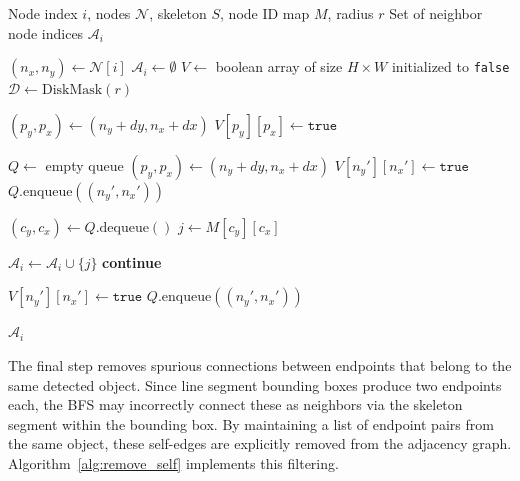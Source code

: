 \begin{algorithm}[H]
\caption{BFS Neighbors for Node}
\label{alg:bfs_node}
\begin{algorithmic}[1]
\Require Node index $i$, nodes $\mathcal{N}$, skeleton $S$, node ID map $M$, radius $r$
\Ensure Set of neighbor node indices $\mathcal{A}_i$

\State $(n_x, n_y) \gets \mathcal{N}[i]$
\State $\mathcal{A}_i \gets \emptyset$
\State $V \gets$ boolean array of size $H \times W$ initialized to \texttt{false}
\State $\mathcal{D} \gets \text{DiskMask}(r)$

    \State $(p_y, p_x) \gets (n_y + dy, n_x + dx)$
        \State $V[p_y][p_x] \gets \texttt{true}$
    \EndIf
\EndFor

\State $Q \gets$ empty queue
    \State $(p_y, p_x) \gets (n_y + dy, n_x + dx)$
            \State $V[n_y'][n_x'] \gets \texttt{true}$
            \State $Q.\text{enqueue}((n_y', n_x'))$
        \EndIf
    \EndFor
\EndFor

    \State $(c_y, c_x) \gets Q.\text{dequeue}()$
    \State $j \gets M[c_y][c_x]$
    
        \State $\mathcal{A}_i \gets \mathcal{A}_i \cup \{j\}$
        \State \textbf{continue}
    \EndIf
    
            \State $V[n_y'][n_x'] \gets \texttt{true}$
            \State $Q.\text{enqueue}((n_y', n_x'))$
        \EndIf
    \EndFor
\EndWhile

\State \Return $\mathcal{A}_i$
\end{algorithmic}
\end{algorithm}

The final step removes spurious connections between endpoints that belong to the same detected object. Since line segment bounding boxes produce two endpoints each, the BFS may incorrectly connect these as neighbors via the skeleton segment within the bounding box. By maintaining a list of endpoint pairs from the same object, these self-edges are explicitly removed from the adjacency graph. Algorithm~\ref{alg:remove_self} implements this filtering.

